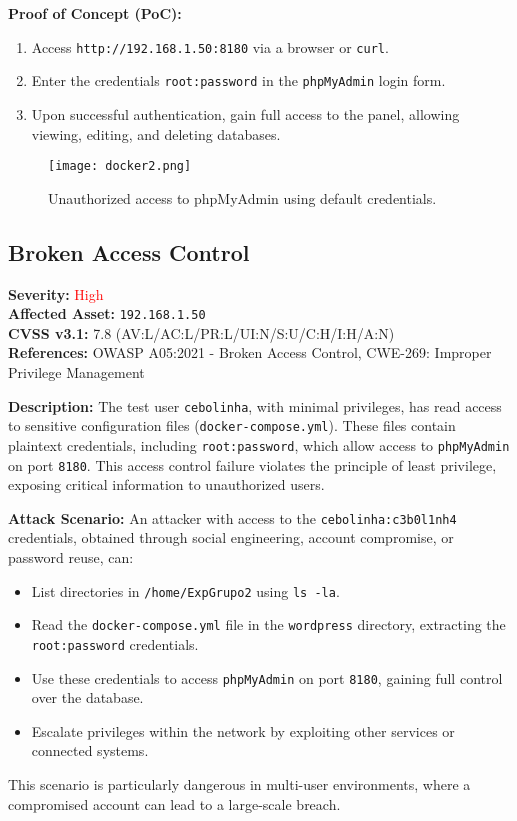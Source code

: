 \documentclass[a4paper,12pt]{article}
\begin{document}
\textbf{Proof of Concept (PoC):}  
\begin{enumerate}
    \item Access \texttt{http://192.168.1.50:8180} via a browser or \texttt{curl}.  
    \item Enter the credentials \texttt{root:password} in the \texttt{phpMyAdmin} login form.  
    \item Upon successful authentication, gain full access to the panel, allowing viewing, editing, and deleting databases.  
\end{enumerate}

\begin{figure}[H]
    \centering
    \texttt{[image: docker2.png]}
    \caption{Unauthorized access to phpMyAdmin using default credentials.}
\end{figure}

\clearpage

\subsection{Broken Access Control}
\textbf{Severity:} \textcolor{Red}{High} \\
\textbf{Affected Asset:} \texttt{192.168.1.50} \\
\textbf{CVSS v3.1:} 7.8 (AV:L/AC:L/PR:L/UI:N/S:U/C:H/I:H/A:N) \\
\textbf{References:} OWASP A05:2021 - Broken Access Control, CWE-269: Improper Privilege Management

\textbf{Description:}  
The test user \texttt{cebolinha}, with minimal privileges, has read access to sensitive configuration files (\texttt{docker-compose.yml}). These files contain plaintext credentials, including \texttt{root:password}, which allow access to \texttt{phpMyAdmin} on port \texttt{8180}. This access control failure violates the principle of least privilege, exposing critical information to unauthorized users.

\textbf{Attack Scenario:}  
An attacker with access to the \texttt{cebolinha:c3b0l1nh4} credentials, obtained through social engineering, account compromise, or password reuse, can:  
\begin{itemize}
    \item List directories in \texttt{/home/ExpGrupo2} using \texttt{ls -la}.  
    \item Read the \texttt{docker-compose.yml} file in the \texttt{wordpress} directory, extracting the \texttt{root:password} credentials.  
    \item Use these credentials to access \texttt{phpMyAdmin} on port \texttt{8180}, gaining full control over the database.  
    \item Escalate privileges within the network by exploiting other services or connected systems.  
\end{itemize}
This scenario is particularly dangerous in multi-user environments, where a compromised account can lead to a large-scale breach.
\end{document}
